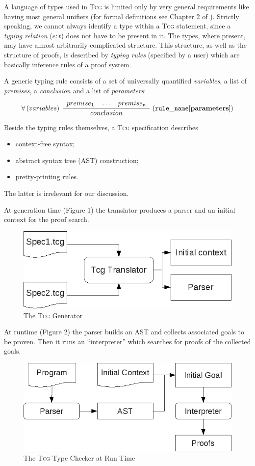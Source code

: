 \documentclass[screen]{beamer}
\newcommand{\Tcg}{\textsc{Tcg}}
\newcounter{premise}
\newcommand{\ifnotempty}[2]{\ifthenelse{\equal{#1}{}}{}{#2}}
\newcommand{\tcgrule}[5]{%
	\setcounter{premise}{0}%
$$%
    \ifnotempty{#1}{%
        \forall \left(#1\right)\;%
    }%
    \dfrac{%
	    \begin{array}[b]{l}%
	    #2%
            \end{array}%
    }{%
            #3%
    }%
    \;\ifnotempty{#4}{(\mathtt{#4}\ifnotempty{#5}{[\mathbf{#5}]})}%
$$%
}
\begin{document}
A language of types used in \Tcg{} is limited only by very general requirements like having most general unifiers (for formal definitions see Chapter 2 of \cite{Tcg}). Strictly speaking, we cannot always identify a type within a \Tcg{} statement, since a \emph{typing relation} ($e : t$) does not have to be present in it. The types, where present, may have almost arbitrarily complicated structure. This structure, as well as the structure of proofs, is described by \emph{typing rules} (specified by a user) which are basically inference rules of a proof system. 

A generic typing rule consists of a set of universally quantified \emph{variables}, a list of \emph{premises}, a \emph{conclusion} and a list of \emph{parameters}: 
\tcgrule{variables}{premise_1 \quad \dots \quad premise_n}{conclusion}{rule\_name}{parameters}

Beside the typing rules themselves, a \Tcg{} specification describes
\begin{itemize}
	\item context-free syntax;
	\item abstract syntax tree (AST) construction;
	\item pretty-printing rules.
\end{itemize}
The latter is irrelevant for our discussion.

At generation time (Figure 1) the translator produces a parser and an initial context for the proof search.

\begin{figure}[htp]
\centering
\includegraphics[width=.7\textwidth]{../generator}
\caption{The \Tcg{} Generator}
\end{figure}

At runtime (Figure 2) the parser builds an AST and collects associated goals to be proven. Then it runs an ``interpreter'' which searches for proofs of the collected goals.

\begin{figure}[htp]
\centering
\includegraphics[width=.7\textwidth]{../runtime}
\caption{The \Tcg{} Type Checker at Run Time}
\end{figure}
\end{document}
